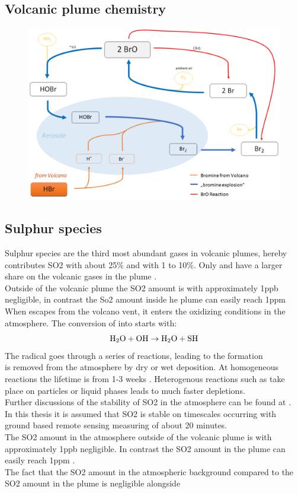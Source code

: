 \documentclass  [
  paper    = a4,
  BCOR     = 10mm,
  twoside,
  fontsize = 12pt,
  fleqn,
  toc      = bibnumbered,
  toc      = listofnumbered,
  numbers  = noendperiod,
  headings = normal,
  listof   = leveldown,
  version  = 3.03
]                                       {scrreprt}
\begin{document}
	\subsection{Volcanic plume chemistry}
	\begin{figure}
		\centering
		\includegraphics[width=0.7\linewidth]{Bilder/Simon/Bilder_Tung/BrO_Explosion}
		\caption{}
		\label{fig:broexplosion}
	\end{figure}
	\subsection{Sulphur species}
	Sulphur species are the third most abundant gases in volcanic plumes, hereby contributes SO2 with about 25\% and  with 1 to 10\%. Only  and  have a larger share on the volcanic gases in the plume .\\
	Outside of the volcanic plume the SO2 amount is with approximately 1ppb negligible, in contrast the So2 amount inside he plume can easily reach 1ppm \cite{Coppenheimer 2003} 
	When  escapes from the volcano vent, it enters the oxidizing conditions in the atmosphere. The conversion of  into  starts with:
	\begin{equation*}
	\ce{H2O}+\ce{OH}\rightarrow \ce{H2O}+\ce{SH}
	\end{equation*} 
	The  radical goes through a series of reactions, leading to the  formation \cite{Seinfeld}\\
	 is removed from the atmosphere by dry or wet
	 deposition. At homogeneous reactions the lifetime is from 1-3 weeks \cite{robock2000volcanic}. Heterogenous reactions such as take place on particles or liquid phases leads to much faster depletions.\\
	 Further discussions of the stability of SO2 in the atmosphere can be found at \cite{lubcke2014optical}.\\
	 In this thesis it is assumed that SO2 is stable on timescales occurring with ground based remote sensing measuring of about 20 minutes. \\
	 The SO2 amount in the atmosphere outside of the volcanic plume is with approximately 1ppb negligible. In contrast the SO2 amount in the plume can easily reach 1ppm \cite{Oppenheimer}.\\
	 The fact that the SO2 amount in the atmospheric background compared to the SO2 amount in the plume is negligible alongside
	
\end{document}
